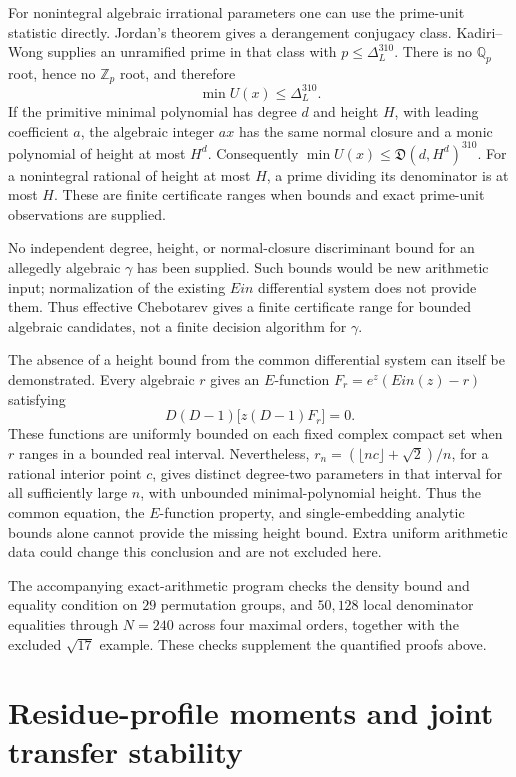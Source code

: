 \documentclass[11pt,a4paper]{article}
\theoremstyle{definition}
\theoremstyle{remark}
\theoremstyle{plain}
\numberwithin{equation}{section}
\def\operatorname#1{#1}\def\mathrm#1{#1}}
\begin{document}
For nonintegral algebraic irrational parameters one can use the
prime-unit statistic directly.  Jordan's theorem gives a derangement
conjugacy class.  Kadiri--Wong supplies an unramified prime in that
class with $p\le\Delta_L^{310}$.  There is no $\mathbb Q_p$ root,
hence no $\mathbb Z_p$ root, and therefore
\[
 \min U(x)\le\Delta_L^{310}.
\]
If the primitive minimal polynomial has degree $d$ and height $H$,
with leading coefficient $a$, the algebraic integer $ax$ has the
same normal closure and a monic polynomial of height at most $H^d$.
Consequently $\min U(x)\le\mathfrak D(d,H^d)^{310}$.
For a nonintegral rational of height at most $H$, a prime dividing
its denominator is at most $H$.  These are finite certificate
ranges when bounds and exact prime-unit observations are supplied.

No independent degree, height, or normal-closure discriminant bound
for an allegedly algebraic $\gamma$ has been supplied.  Such bounds
would be new arithmetic input; normalization of the existing
$\operatorname{Ein}$ differential system does not provide them.
Thus effective Chebotarev gives a finite certificate range for
bounded algebraic candidates, not a finite decision algorithm for
$\gamma$.

The absence of a height bound from the common differential system
can itself be demonstrated.  Every algebraic $r$ gives an $E$-function
$F_r=e^z(\operatorname{Ein}(z)-r)$ satisfying
\[
 D(D-1)\bigl[z(D-1)F_r\bigr]=0.
\]
These functions are uniformly bounded on each fixed complex compact
set when $r$ ranges in a bounded real interval.  Nevertheless,
$r_n=(\lfloor nc\rfloor+\sqrt2)/n$, for a rational interior
point $c$, gives distinct degree-two parameters in that interval
for all sufficiently large $n$, with unbounded minimal-polynomial
height.  Thus the common equation, the $E$-function property, and
single-embedding analytic bounds alone cannot provide the missing
height bound.  Extra uniform arithmetic data could change this
conclusion and are not excluded here.

The accompanying exact-arithmetic program checks the density bound
and equality condition on $29$ permutation groups, and $50{,}128$
local denominator equalities through $N=240$ across four maximal
orders, together with the excluded $\sqrt{17}$ example.  These
checks supplement the quantified proofs above.


\section{Residue-profile moments and joint transfer stability}
\label{sc:sec:generalized-transfer}
\end{document}
